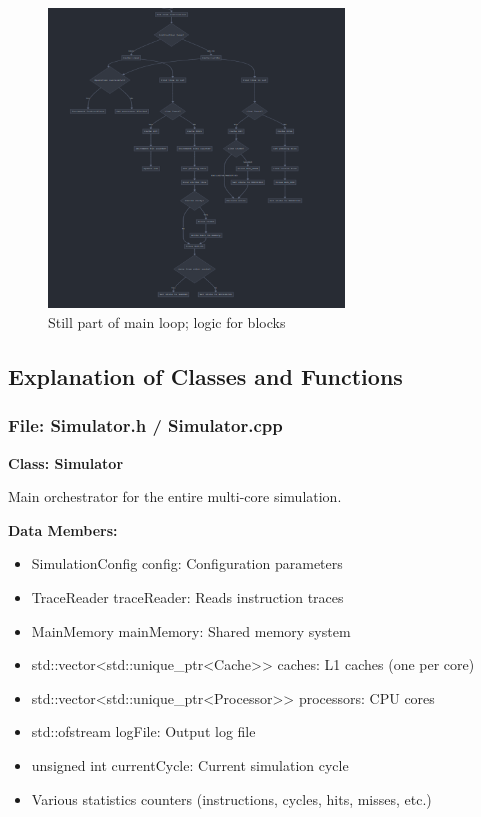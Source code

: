 \documentclass[12pt,a4paper]{article}
\begin{document}
\begin{figure}[H]
    \centering
    \includegraphics[width=0.7\textwidth]{image3.png}
    \caption{Still part of main loop; logic for blocks}
    \label{fig:block-logic}
\end{figure}

\subsection{Explanation of Classes and Functions}

\subsubsection*{File: Simulator.h / Simulator.cpp}

\textbf{Class: Simulator}

Main orchestrator for the entire multi-core simulation.

\textbf{Data Members:}
\begin{itemize}
    \item SimulationConfig config: Configuration parameters
    \item TraceReader traceReader: Reads instruction traces
    \item MainMemory mainMemory: Shared memory system
    \item std::vector<std::unique\_ptr<Cache>> caches: L1 caches (one per core)
    \item std::vector<std::unique\_ptr<Processor>> processors: CPU cores
    \item std::ofstream logFile: Output log file
    \item unsigned int currentCycle: Current simulation cycle
    \item Various statistics counters (instructions, cycles, hits, misses, etc.)
\end{itemize}
\end{document}
